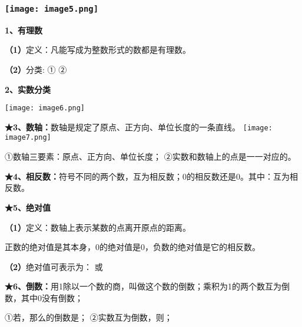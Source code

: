 \hypertarget{ux5b66ux79d1ux7f51www.zxxk.com--ux6559ux80b2ux8d44ux6e90ux95e8ux6237ux63d0ux4f9bux8bd5ux9898ux8bd5ux5377ux6559ux6848ux8bfeux4ef6ux6559ux5b66ux8bbaux6587ux7d20ux6750ux7b49ux5404ux7c7bux6559ux5b66ux8d44ux6e90ux5e93ux4e0bux8f7dux8fd8ux6709ux5927ux91cfux4e30ux5bccux7684ux6559ux5b66ux8d44ux8baf}{%
\subsubsection{\texorpdfstring{\protect\texttt{[image: image5.png]}}{学科网(www.zxxk.com)-\/-教育资源门户，提供试题试卷、教案、课件、教学论文、素材等各类教学资源库下载，还有大量丰富的教学资讯！}}\label{ux5b66ux79d1ux7f51www.zxxk.com--ux6559ux80b2ux8d44ux6e90ux95e8ux6237ux63d0ux4f9bux8bd5ux9898ux8bd5ux5377ux6559ux6848ux8bfeux4ef6ux6559ux5b66ux8bbaux6587ux7d20ux6750ux7b49ux5404ux7c7bux6559ux5b66ux8d44ux6e90ux5e93ux4e0bux8f7dux8fd8ux6709ux5927ux91cfux4e30ux5bccux7684ux6559ux5b66ux8d44ux8baf}}

\textbf{1、有理数}

\textbf{（1）}定义：凡能写成为整数形式的数都是有理数。

\textbf{（2）}分类: ① ②

\textbf{2、实数分类}

\texttt{[image: image6.png]}

\textbf{★3、数轴：}数轴是规定了原点、正方向、单位长度的一条直线。
\texttt{[image: image7.png]}

①数轴三要素：原点、正方向、单位长度； ②实数和数轴上的点是一一对应的。

\textbf{★4、相反数：}符号不同的两个数，互为相反数；0的相反数还是0。其中：互为相反数。

\textbf{★5、绝对值}

\textbf{（1）}定义：数轴上表示某数的点离开原点的距离。

正数的绝对值是其本身，0的绝对值是0，负数的绝对值是它的相反数。

\textbf{（2）}绝对值可表示为： 或

\textbf{★6、倒数：}用1除以一个数的商，叫做这个数的倒数；乘积为1的两个数互为倒数，其中0没有倒数；

①若，那么的倒数是； ②实数互为倒数，则；

